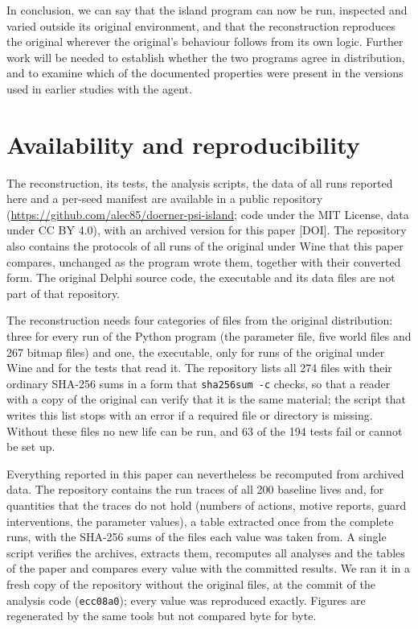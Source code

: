 \documentclass[preprint,12pt,authoryear]{elsarticle}
\newcommand{\todo}[1]{\textcolor{red!70!black}{[#1]}}
\newcommand{\code}[1]{\texttt{#1}}
\begin{document}
In conclusion, we can say that the island program can now be run, inspected and varied outside its original environment, and that the reconstruction reproduces the original wherever the original's behaviour follows from its own logic. Further work will be needed to establish whether the two programs agree in distribution, and to examine which of the documented properties were present in the versions used in earlier studies with the agent.

\section{Availability and reproducibility}
\label{sec:availability}

The reconstruction, its tests, the analysis scripts, the data of all runs reported here and a per-seed manifest are available in a public repository (\url{https://github.com/alec85/doerner-psi-island}; code under the MIT License, data under CC BY 4.0), with an archived version for this paper \todo{DOI}. The repository also contains the protocols of all runs of the original under Wine that this paper compares, unchanged as the program wrote them, together with their converted form. The original Delphi source code, the executable and its data files are not part of that repository.

The reconstruction needs four categories of files from the original distribution: three for every run of the Python program (the parameter file, five world files and 267 bitmap files) and one, the executable, only for runs of the original under Wine and for the tests that read it. The repository lists all 274 files with their ordinary SHA-256 sums in a form that \code{sha256sum -c} checks, so that a reader with a copy of the original can verify that it is the same material; the script that writes this list stops with an error if a required file or directory is missing. Without these files no new life can be run, and 63 of the 194 tests fail or cannot be set up.

Everything reported in this paper can nevertheless be recomputed from archived data. The repository contains the run traces of all 200 baseline lives and, for quantities that the traces do not hold (numbers of actions, motive reports, guard interventions, the parameter values), a table extracted once from the complete runs, with the SHA-256 sums of the files each value was taken from. A single script verifies the archives, extracts them, recomputes all analyses and the tables of the paper and compares every value with the committed results. We ran it in a fresh copy of the repository without the original files, at the commit of the analysis code (\code{ecc08a0}); every value was reproduced exactly. Figures are regenerated by the same tools but not compared byte for byte.
\end{document}
